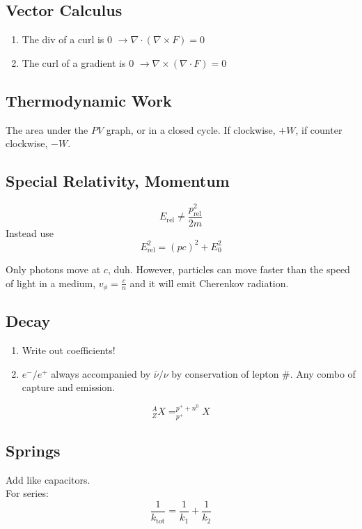 \documentclass[10pt,letter]{article}
\begin{document}
\subsection{Vector Calculus}
\begin{enumerate}
    \item The div of a curl is 0 $\rightarrow \nabla \cdot (\nabla \times F) = 0$
    \item The curl of a gradient is 0 $\rightarrow \nabla \times (\nabla \cdot F)=0$
\end{enumerate}

\subsection{Thermodynamic Work}
The area under the $PV$ graph, or in a closed cycle. If clockwise, $+W$, if counter clockwise, $-W$. 

\subsection{Special Relativity, Momentum}
\begin{equation}
 E_{\textrm{rel}} \neq \frac{p^2_{\textrm{rel}}}{2m}
\end{equation}
Instead use
\begin{equation}
 E^2_{\textrm{rel}} = (pc)^2 + E_0^2
\end{equation}

Only photons move at $c$, duh. However, particles can move faster than the speed of light in a medium, $v_\phi = \frac{c}{n}$ and it will emit Cherenkov radiation.

\subsection{Decay}
\begin{enumerate}
    \item Write out coefficients!
    \item $e^-/e^+$ always accompanied by $\bar{\nu}/\nu$ by conservation of lepton \#. Any combo of capture and emission.
\end{enumerate}

\begin{equation}
 ^A_ZX = ^{p^+ + n^0}_{p^+}X 
\end{equation}

\subsection{Springs}
Add like capacitors.\\
For series:
\begin{equation}
    \frac{1}{k_{\textrm{tot}}} = \frac{1}{k_1} + \frac{1}{k_2}
\end{equation}
\end{document}
